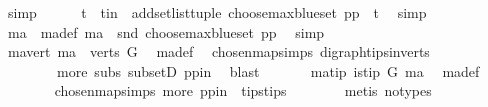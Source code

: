\begin{isabellebody}
\ simp\isanewline
\ \ \ \ \isamarkupfalse%
\ t\ \ t{\isacharunderscore}{\kern0pt}in\ {\isacharcolon}{\kern0pt}\ {\isachardoublequoteopen}{\isacharparenleft}{\kern0pt}add{\isacharunderscore}{\kern0pt}set{\isacharunderscore}{\kern0pt}list{\isacharunderscore}{\kern0pt}tuple\ {\isacharparenleft}{\kern0pt}choose{\isacharunderscore}{\kern0pt}max{\isacharunderscore}{\kern0pt}blue{\isacharunderscore}{\kern0pt}set\ pp{\isacharparenright}{\kern0pt}{\isacharparenright}{\kern0pt}\ {\isacharequal}{\kern0pt}\ t{\isachardoublequoteclose}\ \isamarkupfalse%
\ simp\isanewline
\ \ \ \ \isamarkupfalse%
\ ma\ \ ma{\isacharunderscore}{\kern0pt}def{\isacharcolon}{\kern0pt}\ {\isachardoublequoteopen}ma\ {\isacharequal}{\kern0pt}\ {\isacharparenleft}{\kern0pt}snd\ {\isacharparenleft}{\kern0pt}choose{\isacharunderscore}{\kern0pt}max{\isacharunderscore}{\kern0pt}blue{\isacharunderscore}{\kern0pt}set\ pp{\isacharparenright}{\kern0pt}{\isacharparenright}{\kern0pt}{\isachardoublequoteclose}\ \isamarkupfalse%
\ simp\isanewline
\ \ \ \ \isamarkupfalse%
\ ma{\isacharunderscore}{\kern0pt}vert{\isacharcolon}{\kern0pt}\ {\isachardoublequoteopen}ma\ {\isasymin}\ verts\ G{\isachardoublequoteclose}\ \isamarkupfalse%
\ ma{\isacharunderscore}{\kern0pt}def\ \isamarkupfalse%
\ chosen{\isacharunderscore}{\kern0pt}map{\isacharunderscore}{\kern0pt}simps{\isacharparenleft}{\kern0pt}{}{\isacharparenright}{\kern0pt}\ digraph{\isachardot}{\kern0pt}tips{\isacharunderscore}{\kern0pt}in{\isacharunderscore}{\kern0pt}verts\isanewline
\ \ \ \ \ \ \ \ more{\isacharparenleft}{\kern0pt}{}{\isacharparenright}{\kern0pt}\ subs\ subsetD\ pp{\isacharunderscore}{\kern0pt}in\ \isamarkupfalse%
\ blast\ \isanewline
\ \ \ \ \isamarkupfalse%
\ ma{\isacharunderscore}{\kern0pt}tip{\isacharcolon}{\kern0pt}\ {\isachardoublequoteopen}is{\isacharunderscore}{\kern0pt}tip\ G\ ma{\isachardoublequoteclose}\ \isamarkupfalse%
\ ma{\isacharunderscore}{\kern0pt}def\isanewline
\ \ \ \ \ \ \isamarkupfalse%
\ chosen{\isacharunderscore}{\kern0pt}map{\isacharunderscore}{\kern0pt}simps{\isacharparenleft}{\kern0pt}{}{\isacharparenright}{\kern0pt}\ more\ pp{\isacharunderscore}{\kern0pt}in\ \ tips{\isacharunderscore}{\kern0pt}tips\isanewline
\ \ \ \ \ \ \isamarkupfalse%
\ {\isacharparenleft}{\kern0pt}metis\ {\isacharparenleft}{\kern0pt}no{\isacharunderscore}{\kern0pt}types{\isacharparenright}{\kern0pt}{\isacharparenright}{\kern0pt}\ \ \ \ \ \ \ \ \ \ \isanewline

\end{isabellebody}
